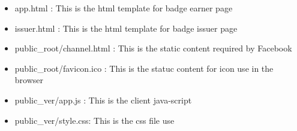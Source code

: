 \begin{itemize}
\item app.html : This is the html template for badge earner page
\item issuer.html : This is the html template for badge issuer page
\item public{\_}root/channel.html : This is the static content required by Facebook 
\item public{\_}root/favicon.ico : This is the statuc content for icon use in the browser
\item public{\_}ver/app.js : This is the client java-script  
\item public{\_}ver/style.css: This is the css file use
\end{itemize}
